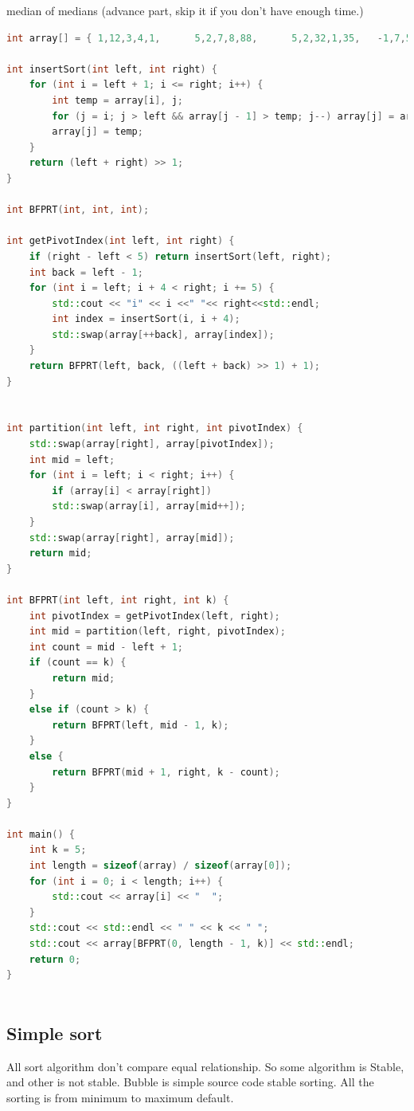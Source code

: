 \documentclass[a4paper,11pt,twoside]{book}
\begin{document}
	\par median of medians (advance part, skip it if you don't have enough time.)
\begin{lstlisting}[frame=single, language=c++, basicstyle=\scriptsize]
int array[] = { 1,12,3,4,1,      5,2,7,8,88,      5,2,32,1,35,   -1,7,5,38,-11 };

int insertSort(int left, int right) {
	for (int i = left + 1; i <= right; i++) {
		int temp = array[i], j;
		for (j = i; j > left && array[j - 1] > temp; j--) array[j] = array[j - 1];
		array[j] = temp;
	}
	return (left + right) >> 1;
}

int BFPRT(int, int, int);

int getPivotIndex(int left, int right) {
	if (right - left < 5) return insertSort(left, right);
	int back = left - 1;
	for (int i = left; i + 4 < right; i += 5) {
		std::cout << "i" << i <<" "<< right<<std::endl;
		int index = insertSort(i, i + 4);
		std::swap(array[++back], array[index]);
	}
	return BFPRT(left, back, ((left + back) >> 1) + 1);
}


int partition(int left, int right, int pivotIndex) {
	std::swap(array[right], array[pivotIndex]);
	int mid = left;
	for (int i = left; i < right; i++) {
		if (array[i] < array[right])
		std::swap(array[i], array[mid++]);
	}
	std::swap(array[right], array[mid]);
	return mid;
}

int BFPRT(int left, int right, int k) {
	int pivotIndex = getPivotIndex(left, right);
	int mid = partition(left, right, pivotIndex);
	int count = mid - left + 1;
	if (count == k) {
		return mid;
	}
	else if (count > k) {
		return BFPRT(left, mid - 1, k);
	}
	else {
		return BFPRT(mid + 1, right, k - count);
	}
}

int main() {
	int k = 5;
	int length = sizeof(array) / sizeof(array[0]);
	for (int i = 0; i < length; i++) {
		std::cout << array[i] << "  ";
	}
	std::cout << std::endl << " " << k << " ";
	std::cout << array[BFPRT(0, length - 1, k)] << std::endl;
	return 0;
}
	
\end{lstlisting}


\subsection{Simple sort}

	
	\par All sort algorithm don't compare equal relationship. So some algorithm is Stable, and other is not stable. Bubble is simple source code stable sorting. All the sorting is from minimum to maximum default.
\end{document}
